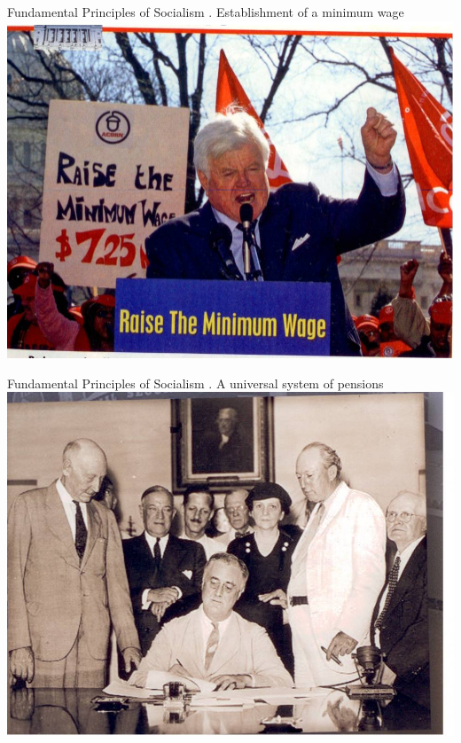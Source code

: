 \begin{frame}{Fundamental Principles of Socialism}
    . Establishment of a minimum wage \\
    \includegraphics[width=.9\textwidth]{img/wage.jpg} \\
\end{frame}

\begin{frame}{Fundamental Principles of Socialism}
    . A universal system of pensions \\
    \includegraphics[width=.9\textwidth]{img/pensions.jpg} \\
\end{frame}


